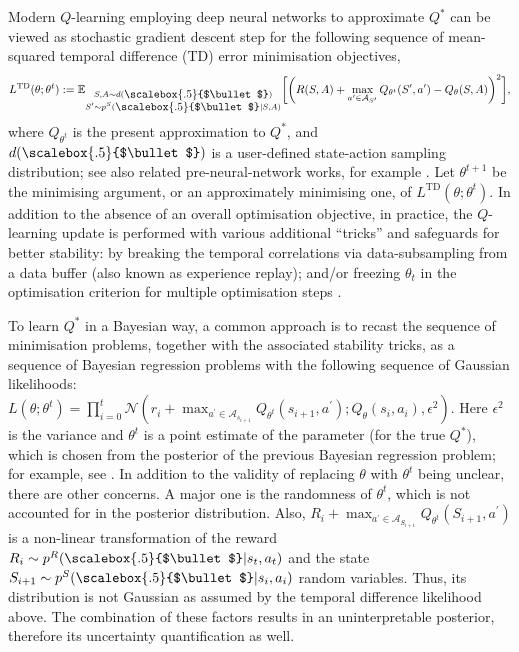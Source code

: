 \documentclass{amsart}
\renewcommand{\cdot}[1][.5]{%
  \mathbin{\vcenter{\hbox{\scalebox{#1}{$\bullet$}}}}%
}
\begin{document}
Modern $Q$-learning employing deep neural networks \citep{dqn_humanlevel,qlearningtheory, td_optimperspective} to approximate $Q^*$ can be viewed as stochastic gradient descent step for the following sequence of mean-squared temporal difference (TD) error minimisation objectives,
$$ L^{\mathrm{TD}}(\theta;\theta^t)  := \mathbb{E}_{\substack{S,A \sim d(\cdot) \\ S^\prime \sim p^S(\cdot|S,A)}} \bigg[\bigg(R(S,A) + \max_{a^\prime \in \mathcal{A}_{S^\prime}} Q_{\theta^t} (S^\prime,a^\prime) - Q_\theta(S,A)\bigg)^2\bigg],$$
where $Q_{\theta^t}$ is the present approximation to $Q^*$, and $d(\cdot)$ is a user-defined state-action sampling distribution; see also related pre-neural-network works, for example \citet{residualgradient_baird1995,fittedqiter}. Let $\theta^{t+1}$ be the minimising argument, or an approximately minimising one, of $L^{\mathrm{TD}}(\theta;\theta^t)$. In addition to the absence of an overall optimisation objective, in practice, the $Q$-learning update is performed with various additional ``tricks'' and safeguards for better stability: by breaking the temporal correlations via data-subsampling from a data buffer (also known as experience replay); and/or freezing $\theta_t$ in the optimisation criterion for multiple optimisation steps \citep{neuralfittedqiter, dqn_humanlevel, doubledqn}.

To learn $Q^*$ in a Bayesian way, a common approach is to recast the sequence of minimisation problems, together with the associated stability tricks, as a sequence of  Bayesian regression problems with the following sequence of  Gaussian likelihoods: $L(\theta;\theta^t) = \prod_{i=0}^t \mathcal{N}(r_i+\max_{a^\prime \in \mathcal{A}_{s_{i+1}}}Q_{\theta^t}(s_{i+1},a^\prime);Q_{\theta}(s_i,a_i),\epsilon^2)$. Here  $\epsilon^2$ is the variance and  $\theta^t$ is a point estimate of the parameter (for the true $Q^*$), which is chosen from the posterior of the previous Bayesian regression problem; for example, see \citet{dropout,bootstraposband,randomisedpriorwithensembleosband,randomisedvaluefunction, tdsmc}. In addition to the validity of replacing $\theta$ with $\theta^t$ being unclear, there are other concerns. A major one is the randomness of $\theta^t$, which is not accounted for in the posterior distribution. Also, $R_i + \max_{a^\prime \in \mathcal{A}_{S_{i+1}}} Q_{\theta^t} (S_{i+1},a^\prime)$ is a non-linear transformation of the reward $R_i\sim p^R(\cdot|s_t,a_t)$ and the state $S_{i+1}\sim p^S(\cdot \vert s_i,a_i)$ random variables. Thus, its distribution is not Gaussian as assumed by the temporal difference likelihood above. The combination of these factors results in an uninterpretable posterior, therefore its uncertainty quantification as well.
\end{document}
